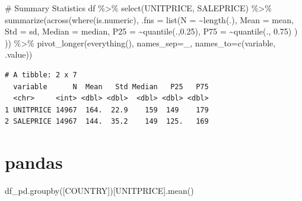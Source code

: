 \documentclass[
  letterpaper,
  DIV=11,
  numbers=noendperiod]{scrreprt}
\newenvironment{Shaded}{\begin{snugshade}}{\end{snugshade}}
\newcommand{\AttributeTok}[1]{\textcolor[rgb]{0.40,0.45,0.13}{#1}}
\newcommand{\CommentTok}[1]{\textcolor[rgb]{0.37,0.37,0.37}{#1}}
\newcommand{\FloatTok}[1]{\textcolor[rgb]{0.68,0.00,0.00}{#1}}
\newcommand{\FunctionTok}[1]{\textcolor[rgb]{0.28,0.35,0.67}{#1}}
\newcommand{\NormalTok}[1]{\textcolor[rgb]{0.00,0.23,0.31}{#1}}
\newcommand{\SpecialCharTok}[1]{\textcolor[rgb]{0.37,0.37,0.37}{#1}}
\newcommand{\StringTok}[1]{\textcolor[rgb]{0.13,0.47,0.30}{#1}}
\begin{document}
\begin{Shaded}
\begin{Highlighting}[]
\CommentTok{\# Summary Statistics }
\NormalTok{df }\SpecialCharTok{\%\textgreater{}\%}
  \FunctionTok{select}\NormalTok{(UNITPRICE, SALEPRICE) }\SpecialCharTok{\%\textgreater{}\%}
  \FunctionTok{summarize}\NormalTok{(}\FunctionTok{across}\NormalTok{(}\FunctionTok{where}\NormalTok{(is.numeric), }
                   \AttributeTok{.fns =} \FunctionTok{list}\NormalTok{(}\AttributeTok{N =} \SpecialCharTok{\textasciitilde{}}\FunctionTok{length}\NormalTok{(.),}
                               \AttributeTok{Mean =}\NormalTok{ mean, }
                               \AttributeTok{Std =}\NormalTok{ sd,}
                               \AttributeTok{Median =}\NormalTok{ median, }
                               \AttributeTok{P25 =} \SpecialCharTok{\textasciitilde{}}\FunctionTok{quantile}\NormalTok{(.,}\FloatTok{0.25}\NormalTok{), }
                               \AttributeTok{P75 =} \SpecialCharTok{\textasciitilde{}}\FunctionTok{quantile}\NormalTok{(., }\FloatTok{0.75}\NormalTok{)}
\NormalTok{                               )}
\NormalTok{                   )) }\SpecialCharTok{\%\textgreater{}\%}
  \FunctionTok{pivot\_longer}\NormalTok{(}\FunctionTok{everything}\NormalTok{(), }\AttributeTok{names\_sep=}\StringTok{\textquotesingle{}\_\textquotesingle{}}\NormalTok{, }\AttributeTok{names\_to=}\FunctionTok{c}\NormalTok{(}\StringTok{\textquotesingle{}variable\textquotesingle{}}\NormalTok{, }\StringTok{\textquotesingle{}.value\textquotesingle{}}\NormalTok{))  }
\end{Highlighting}
\end{Shaded}

\begin{verbatim}
# A tibble: 2 x 7
  variable      N  Mean   Std Median   P25   P75
  <chr>     <int> <dbl> <dbl>  <dbl> <dbl> <dbl>
1 UNITPRICE 14967  164.  22.9    159  149    179
2 SALEPRICE 14967  144.  35.2    149  125.   169
\end{verbatim}

\section{pandas}

\begin{Shaded}
\begin{Highlighting}[]
\NormalTok{df\_pd.groupby([}\StringTok{\textquotesingle{}COUNTRY\textquotesingle{}}\NormalTok{])[}\StringTok{\textquotesingle{}UNITPRICE\textquotesingle{}}\NormalTok{].mean()}
\end{Highlighting}
\end{Shaded}
\end{document}

